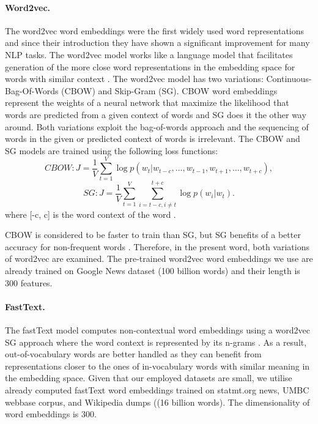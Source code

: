 \documentclass[hidelinks]{llncs}
\begin{document}
\paragraph{Word2vec. }The word2vec word embeddings were the first widely used word representations and since their introduction they have shown a significant improvement for many NLP tasks. The word2vec model works like a language model that facilitates generation of the more close word representations in the embedding space for words with similar context \cite{mikolov2013distributed}. The word2vec model has two variations: Continuous-Bag-Of-Words (CBOW) and Skip-Gram (SG). CBOW word embeddings represent the weights of a neural network that maximize the likelihood that words are predicted from a given context of words and SG does it the other way around. Both variations exploit the bag-of-words approach and the sequencing of words in the given or predicted context of words is irrelevant. The CBOW and SG models are trained using the following loss functions:
\begin {equation}
\label{equation7}
CBOW: J = \frac{1}{V}\sum_{t=1}^{V}\log p(w_t|w_{t-c}, \dots, w_{t-1}, w_{t+1}, \dots, w_{t+c}),
\end {equation}
\begin {equation}
\label{equation8}
SG: J = \frac{1}{V}\sum_{t=1}^{V}\sum_{i=t-c,i\neq t}^{t+c} \log p(w_i|w_t).
\end {equation}
where [-c, c] is the word context of the word .

CBOW is considered to be faster to train than SG, but SG benefits of a better accuracy for non-frequent words \cite{ay2018evaluating}. Therefore, in the present word, both variations of word2vec are examined. The pre-trained word2vec word embeddings we use are already trained on Google News dataset (100 billion words) and their length is 300 features.

\paragraph{FastText. }The fastText model computes non-contextual word embeddings using a word2vec SG approach where the word context is represented by its n-grams \cite{bojanowski2017enriching}. As a result, out-of-vocabulary words are better handled as they can benefit from representations closer to the ones of in-vocabulary words with similar meaning in the embedding space. Given that our employed datasets are small, we utilise already computed fastText word embeddings trained on statmt.org news, UMBC webbase corpus, and Wikipedia dumps ((16 billion words). The dimensionality of word embeddings is 300.
\end{document}
